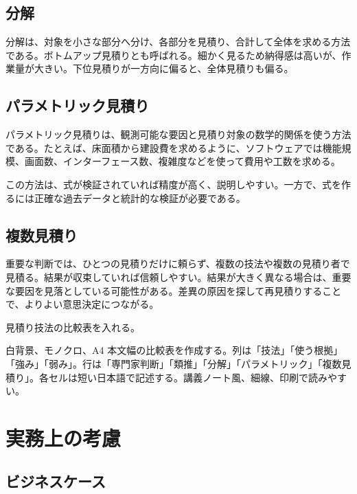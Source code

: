 \documentclass[a4paper,11pt]{article}
\begin{document}
\subsection{分解}

分解は、対象を小さな部分へ分け、各部分を見積り、合計して全体を求める方法である。ボトムアップ見積りとも呼ばれる。細かく見るため納得感は高いが、作業量が大きい。下位見積りが一方向に偏ると、全体見積りも偏る。

\subsection{パラメトリック見積り}

パラメトリック見積りは、観測可能な要因と見積り対象の数学的関係を使う方法である。たとえば、床面積から建設費を求めるように、ソフトウェアでは機能規模、画面数、インターフェース数、複雑度などを使って費用や工数を求める。

この方法は、式が検証されていれば精度が高く、説明しやすい。一方で、式を作るには正確な過去データと統計的な検証が必要である。

\subsection{複数見積り}

重要な判断では、ひとつの見積りだけに頼らず、複数の技法や複数の見積り者で見積る。結果が収束していれば信頼しやすい。結果が大きく異なる場合は、重要な要因を見落としている可能性がある。差異の原因を探して再見積りすることで、よりよい意思決定につながる。

\begin{todobox}
見積り技法の比較表を入れる。
\end{todobox}
\begin{promptbox}
白背景、モノクロ、A4 本文幅の比較表を作成する。列は「技法」「使う根拠」「強み」「弱み」。行は「専門家判断」「類推」「分解」「パラメトリック」「複数見積り」。各セルは短い日本語で記述する。講義ノート風、細線、印刷で読みやすい。
\end{promptbox}

\section{実務上の考慮}

\subsection{ビジネスケース}
\end{document}
